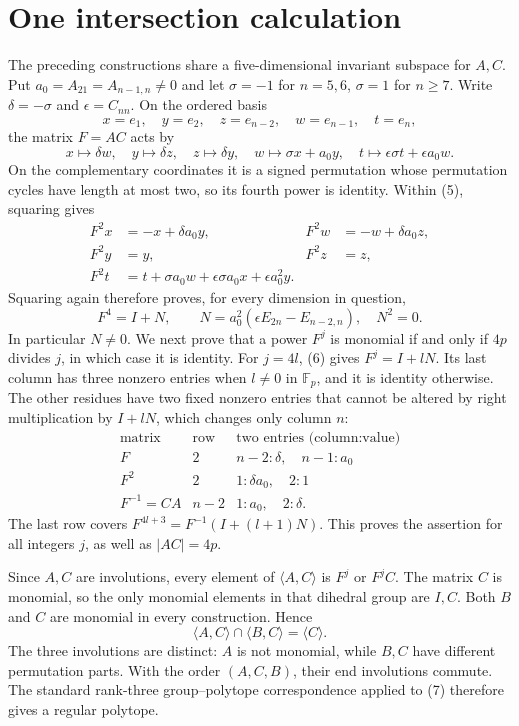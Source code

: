 \documentclass[11pt,a4paper]{article}
\newcommand{\F}{\mathbb F}
\begin{document}
\section{One intersection calculation}
The preceding constructions share a five-dimensional invariant
subspace for $A,C$. Put $a_0=A_{21}=A_{n-1,n}\ne0$ and let
$\sigma=-1$ for $n=5,6$, $\sigma=1$ for $n\ge7$.
Write $\delta=-\sigma$ and $\epsilon=C_{nn}$. On the ordered basis
\[
 x=e_1,\quad y=e_2,\quad z=e_{n-2},\quad w=e_{n-1},\quad t=e_n,
\]
the matrix $F=AC$ acts by
\[
 x\mapsto\delta w,\quad y\mapsto\delta z,\quad
 z\mapsto\delta y,\quad w\mapsto\sigma x+a_0y,
 \quad t\mapsto\epsilon\sigma t+\epsilon a_0w.           \tag{5}
\]
On the complementary coordinates it is a signed permutation whose
permutation cycles have length at most two, so its fourth power is
identity. Within (5), squaring gives
\begin{align*}
 F^2x&=-x+\delta a_0y,& F^2w&=-w+\delta a_0z,\\
 F^2y&=y,&F^2z&=z,\\
 F^2t&=t+\sigma a_0w+\epsilon\sigma a_0x+\epsilon a_0^2y.
\end{align*}
Squaring again therefore proves, for every dimension in question,
\[
 F^4=I+N,\qquad
 N=a_0^2(\epsilon E_{2n}-E_{n-2,n}),\quad N^2=0.         \tag{6}
\]
In particular $N\ne0$. We next prove that a power $F^j$ is monomial
if and only if $4p$ divides $j$, in which case it is identity.
For $j=4l$, (6) gives $F^j=I+lN$. Its last column has three nonzero
entries when $l\ne0$ in $\F_p$, and it is identity otherwise.
The other residues have two fixed nonzero entries that cannot be
altered by right multiplication by $I+lN$, which changes only column $n$:
\[
\begin{array}{c|c|c}
\text{matrix}&\text{row}&\text{two entries (column:value)}\\\hline
F&2&n-2:\delta,\quad n-1:a_0\\
F^2&2&1:\delta a_0,\quad2:1\\
F^{-1}=CA&n-2&1:a_0,\quad2:\delta.
\end{array}
\]
The last row covers $F^{4l+3}=F^{-1}(I+(l+1)N)$.
This proves the assertion for all integers $j$, as well as
$|AC|=4p$.

Since $A,C$ are involutions, every element of $\langle A,C\rangle$
is $F^j$ or $F^jC$. The matrix $C$ is monomial, so the only monomial
elements in that dihedral group are $I,C$. Both $B$ and $C$ are
monomial in every construction. Hence
\[
                  \langle A,C\rangle\cap\langle B,C\rangle
                         =\langle C\rangle.             \tag{7}
\]
The three involutions are distinct: $A$ is not monomial, while $B,C$
have different permutation parts. With the order $(A,C,B)$, their
end involutions commute. The standard rank-three group--polytope
correspondence applied to (7) therefore gives a regular polytope.
\end{document}

